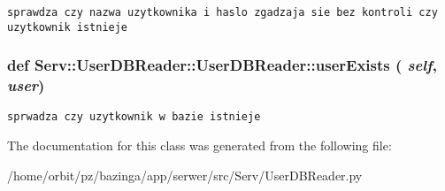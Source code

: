 \footnotesize\begin{verbatim}sprawdza czy nazwa uzytkownika i haslo zgadzaja sie bez kontroli czy uzytkownik istnieje

\end{verbatim}
\normalsize
 \hypertarget{class_serv_1_1_user_d_b_reader_1_1_user_d_b_reader_e3a006e064956d5d09ad1bcaa4c3315f}{
\subsubsection[{userExists}]{\setlength{\rightskip}{0pt plus 5cm}def Serv::UserDBReader::UserDBReader::userExists ( {\em self}, \/   {\em user})}}
\label{class_serv_1_1_user_d_b_reader_1_1_user_d_b_reader_e3a006e064956d5d09ad1bcaa4c3315f}




\footnotesize\begin{verbatim}sprwadza czy uzytkownik w bazie istnieje

\end{verbatim}
\normalsize
 

The documentation for this class was generated from the following file:\begin{CompactItemize}
\item 
/home/orbit/pz/bazinga/app/serwer/src/Serv/UserDBReader.py\end{CompactItemize}
